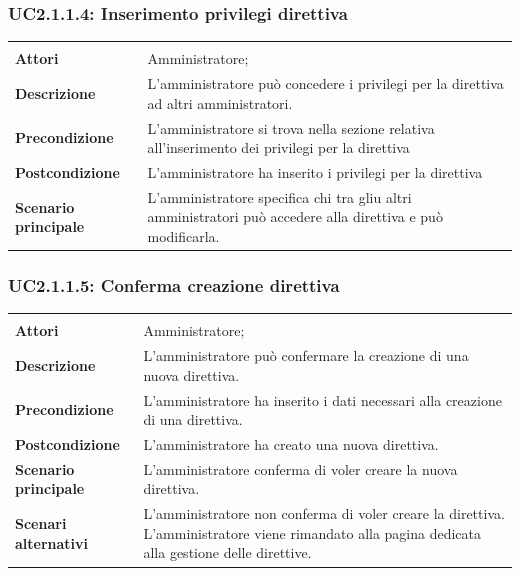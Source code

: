 \subsubsection{UC2.1.1.4: Inserimento privilegi direttiva}
\label{UC2.1.1.4}
\begin{longtable}{l|p{10cm}}
\hline
&\\
\textbf{Attori} & Amministratore;\\[7pt]
\textbf{Descrizione} & L'amministratore può concedere i privilegi per la direttiva ad altri amministratori.\\[7pt]
\textbf{Precondizione} & L'amministratore si trova nella sezione relativa all'inserimento dei privilegi per la direttiva\\[7pt]
\textbf{Postcondizione} & L'amministratore ha inserito i privilegi per la direttiva\\[7pt]
\textbf{Scenario principale} & L'amministratore specifica chi tra gliu altri amministratori può accedere alla direttiva e può modificarla.\\[7pt]\hline
\end{longtable}

\subsubsection{UC2.1.1.5: Conferma creazione direttiva}
\label{UC2.1.1.5}
\begin{longtable}{l|p{10cm}}
\hline
&\\
\textbf{Attori} & Amministratore;\\[7pt]
\textbf{Descrizione} & L'amministratore può confermare la creazione di una nuova direttiva.\\[7pt]
\textbf{Precondizione} & L'amministratore ha inserito i dati necessari alla creazione di una direttiva.\\[7pt]
\textbf{Postcondizione} & L'amministratore ha creato una nuova direttiva.\\[7pt]
\textbf{Scenario principale} & L'amministratore conferma di voler creare la nuova direttiva.\\[7pt]
\textbf{Scenari alternativi} & L'amministratore non conferma di voler creare la direttiva. L'amministratore viene rimandato alla pagina dedicata alla gestione delle direttive.\\[7pt]\hline
\end{longtable}

